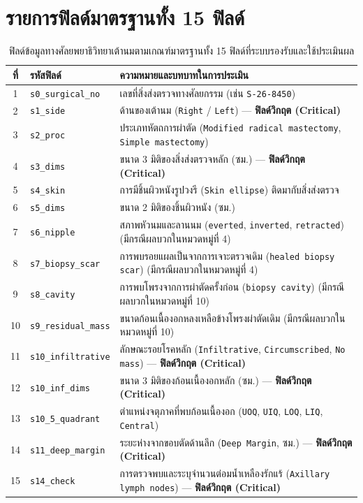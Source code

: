 \section*{รายการฟิลด์มาตรฐานทั้ง 15 ฟิลด์}
\begin{table}[H]
\centering
\caption{ฟิลด์ข้อมูลทางศัลยพยาธิวิทยาเต้านมตามเกณฑ์มาตรฐานทั้ง 15 ฟิลด์ที่ระบบรองรับและใช้ประเมินผล}
\label{tab:appfields}
\small
\begin{tabular}{|c|p{4.6cm}|p{7.0cm}|}
\hline
\textbf{ที่} & \textbf{รหัสฟิลด์} & \textbf{ความหมายและบทบาทในการประเมิน} \\
\hline
1 & \texttt{s0\_surgical\_no} & เลขที่สิ่งส่งตรวจทางศัลยกรรม (เช่น \texttt{S-26-8450}) \\
\hline
2 & \texttt{s1\_side} & ด้านของเต้านม (\texttt{Right} / \texttt{Left}) --- \textbf{ฟิลด์วิกฤต (Critical)} \\
\hline
3 & \texttt{s2\_proc} & ประเภทหัตถการผ่าตัด (\texttt{Modified radical mastectomy}, \texttt{Simple mastectomy}) \\
\hline
4 & \texttt{s3\_dims} & ขนาด 3 มิติของสิ่งส่งตรวจหลัก (ซม.) --- \textbf{ฟิลด์วิกฤต (Critical)} \\
\hline
5 & \texttt{s4\_skin} & การมีชิ้นผิวหนังรูปวงรี (\texttt{Skin ellipse}) ติดมากับสิ่งส่งตรวจ \\
\hline
6 & \texttt{s5\_dims} & ขนาด 2 มิติของชิ้นผิวหนัง (ซม.) \\
\hline
7 & \texttt{s6\_nipple} & สภาพหัวนมและลานนม (\texttt{everted}, \texttt{inverted}, \texttt{retracted}) (มีกรณีผลบวกในหมวดหมู่ที่ 4) \\
\hline
8 & \texttt{s7\_biopsy\_scar} & การพบรอยแผลเป็นจากการเจาะตรวจเดิม (\texttt{healed biopsy scar}) (มีกรณีผลบวกในหมวดหมู่ที่ 4) \\
\hline
9 & \texttt{s8\_cavity} & การพบโพรงจากการผ่าตัดครั้งก่อน (\texttt{biopsy cavity}) (มีกรณีผลบวกในหมวดหมู่ที่ 10) \\
\hline
10 & \texttt{s9\_residual\_mass} & ขนาดก้อนเนื้องอกหลงเหลือข้างโพรงผ่าตัดเดิม (มีกรณีผลบวกในหมวดหมู่ที่ 10) \\
\hline
11 & \texttt{s10\_infiltrative} & ลักษณะรอยโรคหลัก (\texttt{Infiltrative}, \texttt{Circumscribed}, \texttt{No mass}) --- \textbf{ฟิลด์วิกฤต (Critical)} \\
\hline
12 & \texttt{s10\_inf\_dims} & ขนาด 3 มิติของก้อนเนื้องอกหลัก (ซม.) --- \textbf{ฟิลด์วิกฤต (Critical)} \\
\hline
13 & \texttt{s10\_5\_quadrant} & ตำแหน่งจตุภาคที่พบก้อนเนื้องอก (\texttt{UOQ}, \texttt{UIQ}, \texttt{LOQ}, \texttt{LIQ}, \texttt{Central}) \\
\hline
14 & \texttt{s11\_deep\_margin} & ระยะห่างจากขอบตัดด้านลึก (\texttt{Deep Margin}, ซม.) --- \textbf{ฟิลด์วิกฤต (Critical)} \\
\hline
15 & \texttt{s14\_check} & การตรวจพบและระบุจำนวนต่อมน้ำเหลืองรักแร้ (\texttt{Axillary lymph nodes}) --- \textbf{ฟิลด์วิกฤต (Critical)} \\
\hline
\end{tabular}
\end{table}

